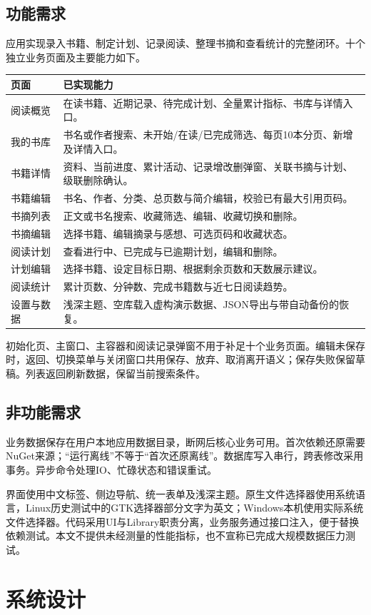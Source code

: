 \documentclass[UTF8,a4paper,11pt,fontset=none]{ctexart}
\begin{document}
\subsection{功能需求}
应用实现录入书籍、制定计划、记录阅读、整理书摘和查看统计的完整闭环。十个独立业务页面及主要能力如下。
\begin{longtable}{p{27mm}p{112mm}}\toprule 页面 & 已实现能力\\\midrule
阅读概览 & 在读书籍、近期记录、待完成计划、全量累计指标、书库与详情入口。\\
我的书库 & 书名或作者搜索、未开始/在读/已完成筛选、每页10本分页、新增及详情入口。\\
书籍详情 & 资料、当前进度、累计活动、记录增改删弹窗、关联书摘与计划、级联删除确认。\\
书籍编辑 & 书名、作者、分类、总页数与简介编辑，校验已有最大引用页码。\\
书摘列表 & 正文或书名搜索、收藏筛选、编辑、收藏切换和删除。\\
书摘编辑 & 选择书籍、编辑摘录与感想、可选页码和收藏状态。\\
阅读计划 & 查看进行中、已完成与已逾期计划，编辑和删除。\\
计划编辑 & 选择书籍、设定目标日期、根据剩余页数和天数展示建议。\\
阅读统计 & 累计页数、分钟数、完成书籍数与近七日阅读趋势。\\
设置与数据 & 浅深主题、空库载入虚构演示数据、JSON导出与带自动备份的恢复。\\\bottomrule
\end{longtable}

初始化页、主窗口、主容器和阅读记录弹窗不用于补足十个业务页面。编辑未保存时，返回、切换菜单与关闭窗口共用保存、放弃、取消离开语义；保存失败保留草稿。列表返回刷新数据，保留当前搜索条件。
\subsection{非功能需求}
业务数据保存在用户本地应用数据目录，断网后核心业务可用。首次依赖还原需要NuGet来源；“运行离线”不等于“首次还原离线”。数据库写入串行，跨表修改采用事务。异步命令处理IO、忙碌状态和错误重试。

界面使用中文标签、侧边导航、统一表单及浅深主题。原生文件选择器使用系统语言，Linux历史测试中的GTK选择器部分文字为英文；Windows本机使用实际系统文件选择器。代码采用UI与Library职责分离，业务服务通过接口注入，便于替换依赖测试。本文不提供未经测量的性能指标，也不宣称已完成大规模数据压力测试。
\section{系统设计}
\end{document}
